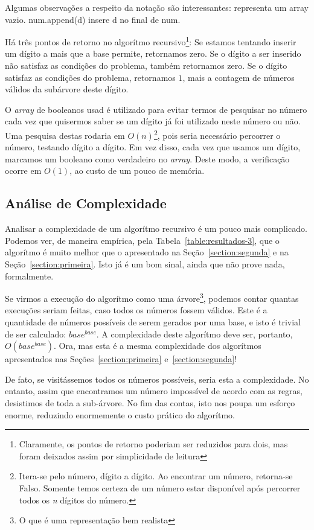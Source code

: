 \documentclass[12pt]{article}
\begin{document}
Algumas observações a respeito da notação são interessantes: {\sf []} representa um array vazio. {\sf num.append(d)} insere {\sf d} no final de {\sf num}.

Há três pontos de retorno no algorítmo recursivo\footnote{Claramente, os pontos de retorno poderiam ser reduzidos para dois, mas foram deixados assim por simplicidade de leitura}: Se estamos tentando inserir um dígito a mais que a base permite, retornamos zero. Se o dígito a ser inserido não satisfaz as condições do problema, também retornamos zero. Se o dígito satisfaz as condições do problema, retornamos $1$, mais a contagem de números válidos da subárvore deste dígito.

O {\em array} de booleanos {\sf usad} é utilizado para evitar termos de pesquisar no número cada vez que quisermos saber se um dígito já foi utilizado neste número ou não. Uma pesquisa destas rodaria em $O(n)$\footnote{Itera-se pelo número, dígito a dígito. Ao encontrar um número, retorna-se Falso. Somente temos certeza de um número estar disponível após percorrer todos os {\em n} dígitos do número.}, pois seria necessário percorrer o número, testando dígito a dígito. Em vez disso, cada vez que usamos um dígito, marcamos um booleano como verdadeiro no {\em array}. Deste modo, a verificação ocorre em $O(1)$, ao custo de um pouco de memória.

\subsection{Análise de Complexidade}\label{section:terceira:complexidade}

Analisar a complexidade de um algorítmo recursivo é um pouco mais complicado. Podemos ver, de maneira empírica, pela Tabela~\ref{table:resultados-3}, que o algorítmo é muito melhor que o apresentado na Seção~\ref{section:segunda} e na Seção~\ref{section:primeira}. Isto já é um bom sinal, ainda que não prove nada, formalmente.

Se virmos a execução do algorítmo como uma árvore\footnote{O que é uma representação bem realista}, podemos contar quantas execuções seriam feitas, caso todos os números fossem válidos. Este é a quantidade de números possíveis de serem gerados por uma base, e isto é trivial de ser calculado: $base^{base}$. A complexidade deste algorítmo deve ser, portanto, $O(base^{base})$. Ora, mas esta é a mesma complexidade dos algorítmos apresentados nas Seções~\ref{section:primeira} e~\ref{section:segunda}!

De fato, se visitássemos todos os números possíveis, seria esta a complexidade. No entanto, assim que encontramos um número impossível de acordo com as regras, desistimos de toda a sub-árvore. No fim das contas, isto nos poupa um esforço enorme, reduzindo enormemente o custo prático do algorítmo.
\end{document}
